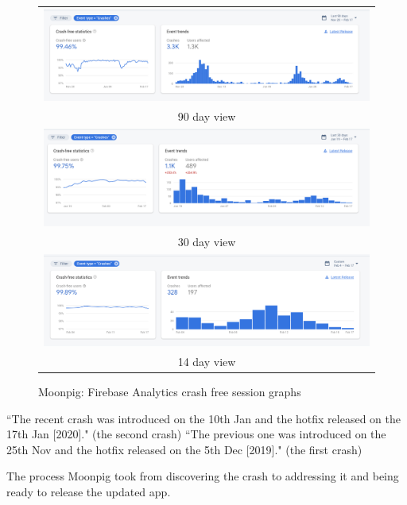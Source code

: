 \begin{figure}
    \centering
    \begin{tabular}{c}
    {\includegraphics[width=14cm]{images/moonpig/firebase_crash_graph_90_days_feb_2020.png}} \\
    90 day view \\
    {\includegraphics[width=14cm]{images/moonpig/firebase_crash_graph_30_days_17_feb_2020.png}} \\
    30 day view \\
    {\includegraphics[width=14cm]{images/moonpig/firebase_crash_graph_14_days_feb_2020.png}} \\
    14 day view
    \end{tabular}
    \caption{Moonpig: Firebase Analytics crash free session graphs}
    \label{fig:moonpig-firebase-feb2020-crash-free-sessions}
\end{figure}

\clearpage

``The recent crash was introduced on the 10th Jan and the hotfix released on the 17th Jan [2020]." (the second crash)
``The previous one was introduced on the 25th Nov and the hotfix released on the 5th Dec [2019]." (the first crash)

The process Moonpig took from discovering the crash to addressing it and being ready to release the updated app.

